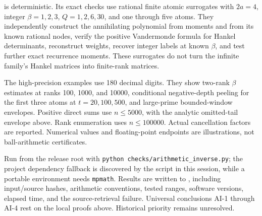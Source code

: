  is deterministic. Its exact
checks use rational finite atomic surrogates with \(2a=4\), integer
\(\beta=1,2,3\), \(Q=1,2,6,30\), and one through five atoms. They
independently construct the annihilating polynomial from moments and
from its known rational nodes, verify the positive Vandermonde formula
for Hankel determinants, reconstruct weights, recover integer labels at
known \(\beta\), and test further exact recurrence moments. These
surrogates do not turn the infinite family's Hankel matrices into
finite-rank matrices.

The high-precision examples use 180 decimal digits. They show two-rank
\(\beta\) estimates at ranks 100, 1000, and 10000, conditional
negative-depth peeling for the first three atoms at \(t=20,100,500\),
and large-prime bounded-window envelopes. Positive direct sums use
\(n\le5000\), with the analytic omitted-tail envelope above. Rank
enumeration uses \(n\le100000\). Actual cancellation factors are
reported. Numerical values and floating-point endpoints are
illustrations, not ball-arithmetic certificates.

Run from the release root with
\texttt{\small python checks/arithmetic\_inverse.py}; the project dependency
fallback is discovered by the script in this session, while a portable
environment needs \texttt{mpmath}. Results are written to
, including
input/source hashes, arithmetic conventions, tested ranges, software
versions, elapsed time, and the source-retrieval failure. Universal
conclusions AI-1 through AI-4 rest on the local proofs above. Historical
priority remains unresolved.
